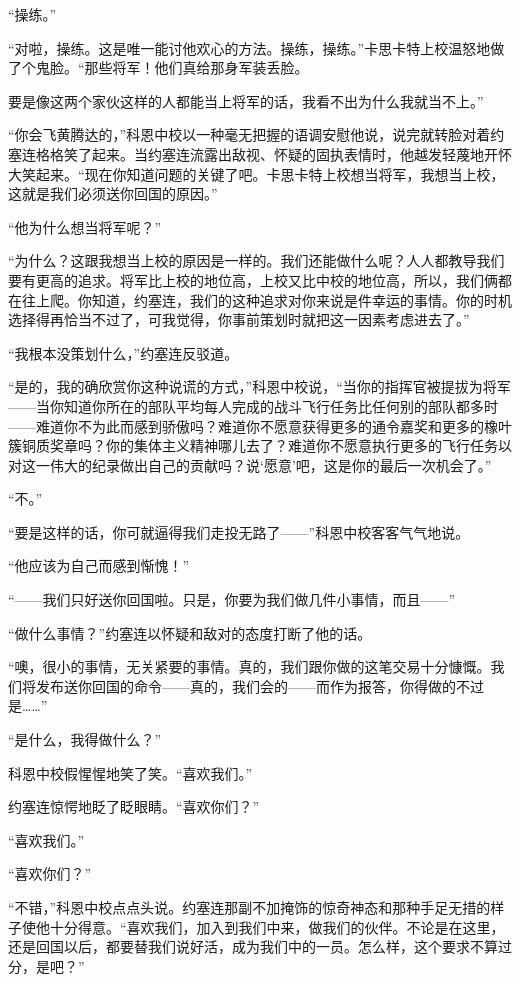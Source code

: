     “操练。”

    “对啦，操练。这是唯一能讨他欢心的方法。操练，操练。”卡思卡特上校温怒地做了个鬼脸。“那些将军！他们真给那身军装丢脸。

    要是像这两个家伙这样的人都能当上将军的话，我看不出为什么我就当不上。”

    “你会飞黄腾达的，”科恩中校以一种毫无把握的语调安慰他说，说完就转脸对着约塞连格格笑了起来。当约塞连流露出敌视、怀疑的固执表情时，他越发轻蔑地开怀大笑起来。“现在你知道问题的关键了吧。卡思卡特上校想当将军，我想当上校，这就是我们必须送你回国的原因。”

    “他为什么想当将军呢？”

    “为什么？这跟我想当上校的原因是一样的。我们还能做什么呢？人人都教导我们要有更高的追求。将军比上校的地位高，上校又比中校的地位高，所以，我们俩都在往上爬。你知道，约塞连，我们的这种追求对你来说是件幸运的事情。你的时机选择得再恰当不过了，可我觉得，你事前策划时就把这一因素考虑进去了。”

    “我根本没策划什么，”约塞连反驳道。

    “是的，我的确欣赏你这种说谎的方式，”科恩中校说，“当你的指挥官被提拔为将军——当你知道你所在的部队平均每人完成的战斗飞行任务比任何别的部队都多时——难道你不为此而感到骄傲吗？难道你不愿意获得更多的通令嘉奖和更多的橡叶簇铜质奖章吗？你的集体主义精神哪儿去了？难道你不愿意执行更多的飞行任务以对这一伟大的纪录做出自己的贡献吗？说‘愿意’吧，这是你的最后一次机会了。”

    “不。”

    “要是这样的话，你可就逼得我们走投无路了——”科恩中校客客气气地说。

    “他应该为自己而感到惭愧！”

    “——我们只好送你回国啦。只是，你要为我们做几件小事情，而且——”

    “做什么事情？”约塞连以怀疑和敌对的态度打断了他的话。

    “噢，很小的事情，无关紧要的事情。真的，我们跟你做的这笔交易十分慷慨。我们将发布送你回国的命令——真的，我们会的——而作为报答，你得做的不过是……”

    “是什么，我得做什么？”

    科恩中校假惺惺地笑了笑。“喜欢我们。”

    约塞连惊愕地眨了眨眼睛。“喜欢你们？”

    “喜欢我们。”

    “喜欢你们？”

    “不错，”科恩中校点点头说。约塞连那副不加掩饰的惊奇神态和那种手足无措的样子使他十分得意。“喜欢我们，加入到我们中来，做我们的伙伴。不论是在这里，还是回国以后，都要替我们说好活，成为我们中的一员。怎么样，这个要求不算过分，是吧？”

